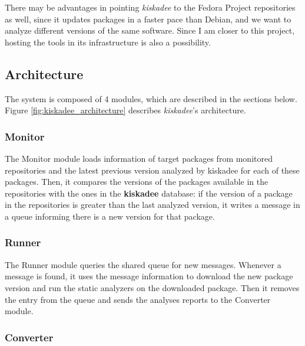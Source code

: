 There may be advantages in pointing \textit{kiskadee} to the Fedora Project
repositories as well, since it updates packages in a faster pace than Debian,
and we want to analyze different versions of the same software. Since I am
closer to this project, hosting the tools in its infrastructure is also a
possibility.

\subsection{Architecture}

The system is composed of 4 modules, which are described in the sections
below. Figure \ref{fig:kiskadee_architecture} describes \textit{kiskadee}'s architecture.


\subsubsection{Monitor}

The Monitor module loads information of target packages from monitored
repositories and the latest previous version analyzed by kiskadee for each of these
packages. Then, it compares the versions of the packages available in the
repositories with the ones in the \textbf{kiskadee} database: if the version of
a package in the repositories is greater than the last analyzed version, it
writes a message in a queue informing there is a new version for that package.

\subsubsection{Runner}

The Runner module queries the shared queue for new messages. Whenever a message
is found, it uses the message information to download the new package version
and run the static analyzers on the downloaded package. Then it removes the
entry from the queue and sends the analyses reports to the Converter module.

\subsubsection{Converter}

